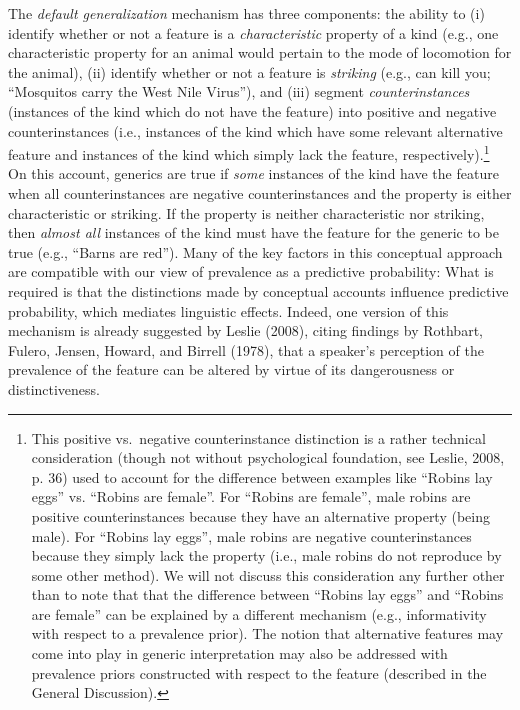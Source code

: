 \documentclass[english,,man,floatsintext]{apa6}
\let\rmarkdownfootnote\footnote%
\def\footnote{\protect\rmarkdownfootnote}
\theoremstyle{definition}
\theoremstyle{definition}
\theoremstyle{definition}
\theoremstyle{remark}
\begin{document}
The \emph{default generalization} mechanism has three components: the
ability to (i) identify whether or not a feature is a
\emph{characteristic} property of a kind (e.g., one characteristic
property for an animal would pertain to the mode of locomotion for the
animal), (ii) identify whether or not a feature is \emph{striking}
(e.g., can kill you; \enquote{Mosquitos carry the West Nile Virus}), and
(iii) segment \emph{counterinstances} (instances of the kind which do
not have the feature) into positive and negative counterinstances (i.e.,
instances of the kind which have some relevant alternative feature and
instances of the kind which simply lack the feature,
respectively).\footnote{This positive vs.~negative counterinstance
  distinction is a rather technical consideration (though not without
  psychological foundation, see Leslie, 2008, p. 36) used to account for
  the difference between examples like \enquote{Robins lay eggs} vs.
  \enquote{Robins are female}. For \enquote{Robins are female}, male
  robins are positive counterinstances because they have an alternative
  property (being male). For \enquote{Robins lay eggs}, male robins are
  negative counterinstances because they simply lack the property (i.e.,
  male robins do not reproduce by some other method). We will not
  discuss this consideration any further other than to note that that
  the difference between \enquote{Robins lay eggs} and \enquote{Robins
  are female} can be explained by a different mechanism (e.g.,
  informativity with respect to a prevalence prior). The notion that
  alternative features may come into play in generic interpretation may
  also be addressed with prevalence priors constructed with respect to
  the feature (described in the General Discussion).} On this account,
generics are true if \emph{some} instances of the kind have the feature
when all counterinstances are negative counterinstances and the property
is either characteristic or striking. If the property is neither
characteristic nor striking, then \emph{almost all} instances of the
kind must have the feature for the generic to be true (e.g.,
\enquote{Barns are red}). Many of the key factors in this conceptual
approach are compatible with our view of prevalence as a predictive
probability: What is required is that the distinctions made by
conceptual accounts influence predictive probability, which mediates
linguistic effects. Indeed, one version of this mechanism is already
suggested by Leslie (2008), citing findings by Rothbart, Fulero, Jensen,
Howard, and Birrell (1978), that a speaker's perception of the
prevalence of the feature can be altered by virtue of its dangerousness
or distinctiveness.
\end{document}
